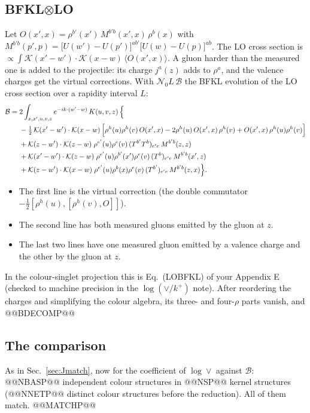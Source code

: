 \documentclass[10pt]{article}
\numberwithin{equation}{section}
\newcommand{\KK}{\mathcal K}
\newcommand{\NO}{\mathcal N_0}
\newcommand{\B}{\mathcal B}
\begin{document}
\subsection{BFKL\texorpdfstring{$\otimes$}{x}LO}\label{sec:Bop}
Let $O(x',x)=\rho^{b'}(x')\,M^{b'b}(x',x)\,\rho^b(x)$ with $M^{b'b}(p',p)=\big[U(w')-U(p')\big]^{ab'}\big[U(w)-U(p)\big]^{ab}$. The LO cross section is $\propto\int\KK(x'-w')\cdot\KK(x-w)\,\langle O(x',x)\rangle$. A gluon harder than the measured one is added to the projectile: its charge $j^a(z)$ adds to $\rho^a$, and the valence charges get the virtual corrections. With $\NO L\,\B$ the BFKL evolution of the LO cross section over a rapidity interval $L$:
\begin{align}
\B={}&2\int_{x,x',u,v,z}e^{-ik\cdot(w'-w)}\,K(u,v,z)\,\Big\{\notag\\
&-\tfrac12\,\KK(x'-w')\cdot\KK(x-w)\,\Big[\rho^h(u)\rho^h(v)\,O(x',x)-2\rho^h(u)\,O(x',x)\,\rho^h(v)+O(x',x)\,\rho^h(u)\rho^h(v)\Big]\notag\\
&+\KK(z-w')\cdot\KK(z-w)\;\rho^{e'}(u)\rho^e(v)\,(T^{b'}T^b)_{e'e}\,M^{b'b}(z,z)\notag\\
&+\KK(x'-w')\cdot\KK(z-w)\;\rho^{e'}(u)\rho^{b'}(x')\rho^e(v)\,(T^b)_{e'e}\,M^{b'b}(x',z)\notag\\
&+\KK(z-w')\cdot\KK(x-w)\;\rho^{e'}(u)\rho^{b}(x)\rho^e(v)\,(T^{b'})_{e'e}\,M^{b'b}(z,x)\Big\}.
\label{eq:Bop}
\end{align}
\begin{itemize}
\item The first line is the virtual correction (the double commutator $-\frac12[\rho^h(u),[\rho^h(v),O]]$).
\item The second line has both measured gluons emitted by the gluon at $z$.
\item The last two lines have one measured gluon emitted by a valence charge and the other by the gluon at $z$.
\end{itemize}
In the colour-singlet projection this is Eq.~(LOBFKL) of your Appendix E (checked to machine precision in the $\log(\vee/k^+)$ note). After reordering the charges and simplifying the colour algebra, its three- and four-$\rho$ parts vanish, and
@@BDECOMP@@

\subsection{The comparison}\label{sec:Pmatch}
As in Sec.~\ref{sec:Jmatch}, now for the coefficient of $\log\vee$ against $\B$: @@NBASP@@ independent colour structures in @@NSP@@ kernel structures (@@NNETP@@ distinct colour structures before the reduction). All of them match.
@@MATCHP@@
\end{document}
